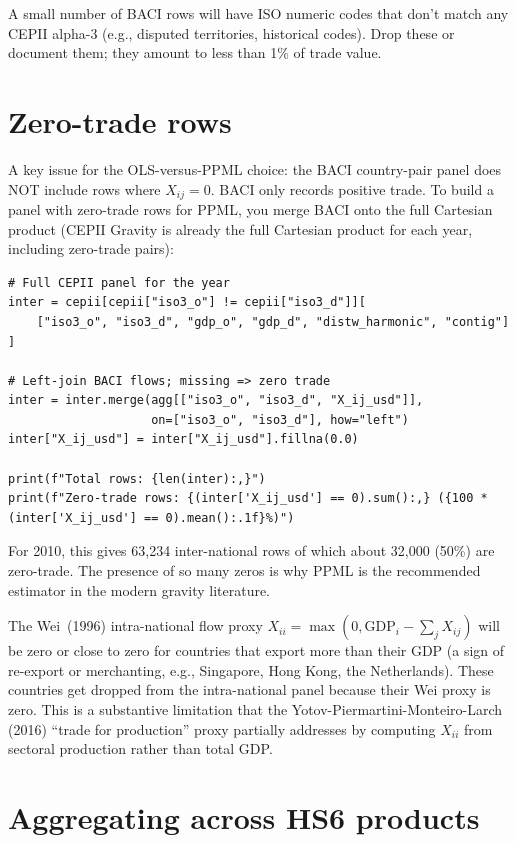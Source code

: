 \documentclass[11pt,letterpaper,oneside]{book}
\theoremstyle{definition}
\theoremstyle{remark}
\begin{document}
A small number of BACI rows will have ISO numeric codes that don't
match any CEPII alpha-3 (e.g., disputed territories, historical
codes). Drop these or document them; they amount to less than 1\% of
trade value.

\section{Zero-trade rows}

A key issue for the OLS-versus-PPML choice: the BACI country-pair
panel does NOT include rows where $X_{ij} = 0$. BACI only records
positive trade. To build a panel with zero-trade rows for PPML, you
merge BACI onto the full Cartesian product (CEPII Gravity is already
the full Cartesian product for each year, including zero-trade pairs):

\begin{lstlisting}
# Full CEPII panel for the year
inter = cepii[cepii["iso3_o"] != cepii["iso3_d"]][
    ["iso3_o", "iso3_d", "gdp_o", "gdp_d", "distw_harmonic", "contig"]
]

# Left-join BACI flows; missing => zero trade
inter = inter.merge(agg[["iso3_o", "iso3_d", "X_ij_usd"]],
                    on=["iso3_o", "iso3_d"], how="left")
inter["X_ij_usd"] = inter["X_ij_usd"].fillna(0.0)

print(f"Total rows: {len(inter):,}")
print(f"Zero-trade rows: {(inter['X_ij_usd'] == 0).sum():,} ({100 * (inter['X_ij_usd'] == 0).mean():.1f}%)")
\end{lstlisting}

For 2010, this gives 63{,}234 inter-national rows of which about
32{,}000 (50\%) are zero-trade. The presence of so many zeros is why
PPML is the recommended estimator in the modern gravity literature.

\begin{caveat}
The Wei~(1996) intra-national flow proxy $X_{ii} = \max(0, \mathrm{GDP}_i - \sum_j X_{ij})$
will be zero or close to zero for countries that export more than their
GDP (a sign of re-export or merchanting, e.g., Singapore, Hong Kong,
the Netherlands). These countries get dropped from the intra-national
panel because their Wei proxy is zero. This is a substantive limitation
that the Yotov-Piermartini-Monteiro-Larch (2016) ``trade for production''
proxy partially addresses by computing $X_{ii}$ from sectoral production
rather than total GDP.
\end{caveat}

\section{Aggregating across HS6 products}
\end{document}
